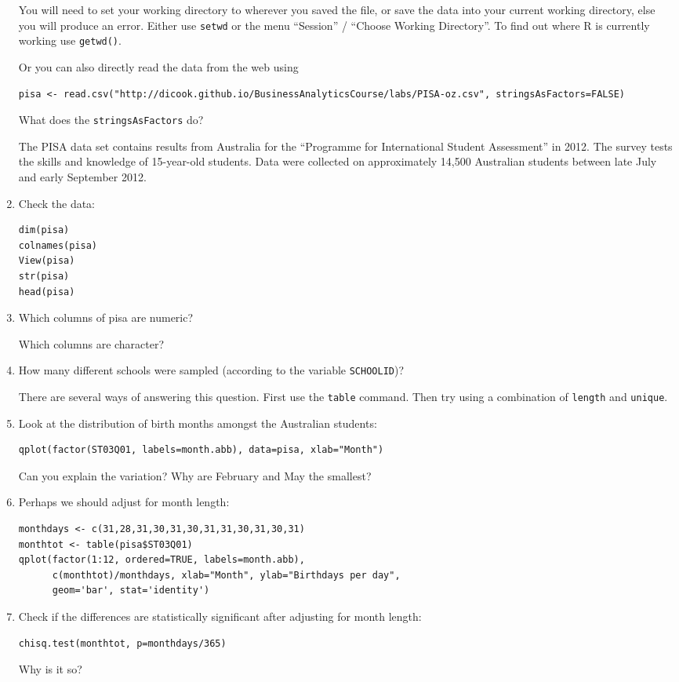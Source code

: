 \documentclass[11pt]{article}
\begin{document}
\begin{enumerate}
You will need to set your working directory to wherever you saved the file, or save the data into your current working directory, else you will produce an error.  Either use \verb|setwd| or the menu ``Session'' / ``Choose Working Directory''. To find out where R is currently working use \verb|getwd()|.

Or you can also directly read the data from the web using

\begin{verbatim}
pisa <- read.csv("http://dicook.github.io/BusinessAnalyticsCourse/labs/PISA-oz.csv", stringsAsFactors=FALSE)
\end{verbatim}


What does the \verb|stringsAsFactors| do?

The PISA data set contains results from Australia for the ``Programme for International Student Assessment'' in 2012. The survey tests the skills and knowledge of 15-year-old students. Data were collected on approximately 14,500 Australian students between late July and early September 2012.

\item Check the data:
\begin{verbatim}
dim(pisa)
colnames(pisa)
View(pisa)
str(pisa)
head(pisa)
\end{verbatim}

\item Which columns of pisa are numeric?

Which columns are character?

\item How many different schools were sampled (according to the variable \verb|SCHOOLID|)?

There are several ways of answering this question. First use the \verb|table| command. Then try using a combination of \verb|length| and \verb|unique|.


\item Look at the distribution of birth months amongst the Australian students:
\begin{verbatim}
qplot(factor(ST03Q01, labels=month.abb), data=pisa, xlab="Month")
\end{verbatim}
Can you explain the variation? Why are February and May the smallest?

\item Perhaps we should adjust for month length:
\begin{verbatim}
monthdays <- c(31,28,31,30,31,30,31,31,30,31,30,31)
monthtot <- table(pisa$ST03Q01)
qplot(factor(1:12, ordered=TRUE, labels=month.abb), 
      c(monthtot)/monthdays, xlab="Month", ylab="Birthdays per day",
      geom='bar', stat='identity')
\end{verbatim}
\item Check if the differences are statistically significant after adjusting for month length:
\begin{verbatim}
chisq.test(monthtot, p=monthdays/365)
\end{verbatim}
Why is it so?


\end{enumerate}
\end{document}
